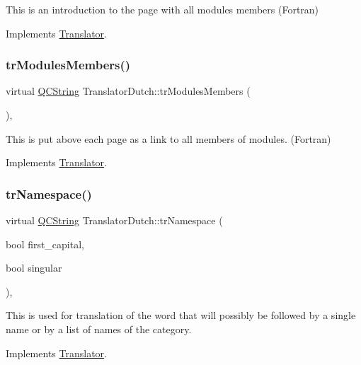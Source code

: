 This is an introduction to the page with all modules members (Fortran) 

Implements \mbox{\hyperlink{class_translator}{Translator}}.

\mbox{\label{class_translator_dutch_abcb1ad6c28db1692ac8fb1446711ed42}} 
\subsubsection{\texorpdfstring{trModulesMembers()}{trModulesMembers()}}
{\footnotesize\ttfamily virtual \mbox{\hyperlink{class_q_c_string}{Q\+C\+String}} Translator\+Dutch\+::tr\+Modules\+Members (\begin{DoxyParamCaption}{ }\end{DoxyParamCaption})\hspace{0.3cm}{\ttfamily [inline]}, {\ttfamily [virtual]}}

This is put above each page as a link to all members of modules. (Fortran) 

Implements \mbox{\hyperlink{class_translator}{Translator}}.

\mbox{\label{class_translator_dutch_ace82533e75f03a0747bb831f4ee0d959}} 
\subsubsection{\texorpdfstring{trNamespace()}{trNamespace()}}
{\footnotesize\ttfamily virtual \mbox{\hyperlink{class_q_c_string}{Q\+C\+String}} Translator\+Dutch\+::tr\+Namespace (\begin{DoxyParamCaption}\item[{bool}]{first\+\_\+capital,  }\item[{bool}]{singular }\end{DoxyParamCaption})\hspace{0.3cm}{\ttfamily [inline]}, {\ttfamily [virtual]}}

This is used for translation of the word that will possibly be followed by a single name or by a list of names of the category. 

Implements \mbox{\hyperlink{class_translator}{Translator}}.

